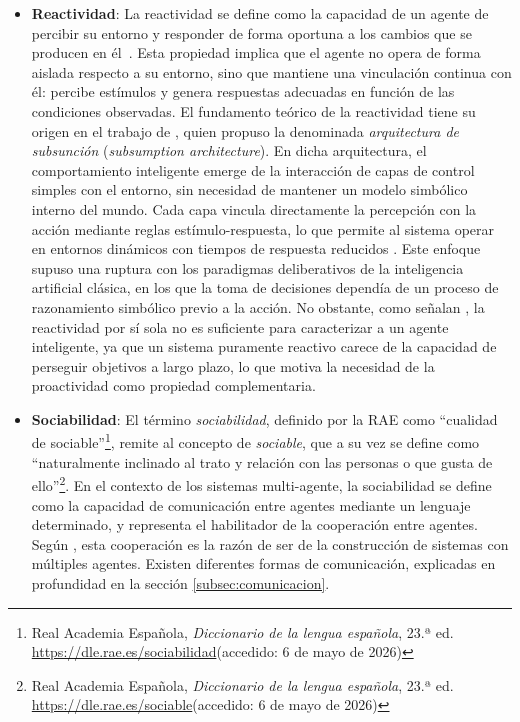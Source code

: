 \begin{itemize}
\begin{itemize}
\item \textbf{Reactividad}:
La reactividad se define como la capacidad de un agente de percibir su entorno y responder de forma oportuna a los cambios que se producen en él~\cite{Wooldridge1995}. Esta propiedad implica que el agente no opera de forma aislada respecto a su entorno, sino que mantiene una vinculación continua con él: percibe estímulos y genera respuestas adecuadas en función de las condiciones observadas. El fundamento teórico de la reactividad tiene su origen en el trabajo de \textcite{brooks1986robust}, quien propuso la denominada \textit{arquitectura de subsunción} (\textit{subsumption architecture}). En dicha arquitectura, el comportamiento inteligente emerge de la interacción de capas de control simples con el entorno, sin necesidad de mantener un modelo simbólico interno del mundo. Cada capa vincula directamente la percepción con la acción mediante reglas estímulo-respuesta, lo que permite al sistema operar en entornos dinámicos con tiempos de respuesta reducidos \cite{brooks1986robust}. Este enfoque supuso una ruptura con los paradigmas deliberativos de la inteligencia artificial clásica, en los que la toma de decisiones dependía de un proceso de razonamiento simbólico previo a la acción. No obstante, como señalan \textcite{Wooldridge1995}, la reactividad por sí sola no es suficiente para caracterizar a un agente inteligente, ya que un sistema puramente reactivo  carece de la capacidad de perseguir objetivos a largo plazo, lo que motiva la necesidad de la proactividad como propiedad complementaria.


\item \textbf{Sociabilidad}:
El término \textit{sociabilidad}, definido por la RAE como \enquote{cualidad de sociable}\footnote{Real Academia Española, \textit{Diccionario de la lengua española}, 23.ª ed. \url{https://dle.rae.es/sociabilidad}(accedido: 6 de mayo de 2026)}, remite al concepto de \textit{sociable}, que a su vez se define como \enquote{naturalmente inclinado al trato y relación con las personas o que gusta de ello}\footnote{Real Academia Española, \textit{Diccionario de la lengua española}, 23.ª ed. \url{https://dle.rae.es/sociable}(accedido: 6 de mayo de 2026)}.
En el contexto de los sistemas multi-agente, la sociabilidad se define como la capacidad de comunicación entre agentes mediante un lenguaje determinado\cite{Wooldridge1995}, y representa el habilitador de la cooperación entre agentes. Según \textcite{nwana1996software}, esta cooperación es la razón de ser de la construcción de sistemas con múltiples agentes. Existen diferentes formas de comunicación, explicadas en profundidad en la sección \ref{subsec:comunicacion}.



\end{itemize}
\end{itemize}
